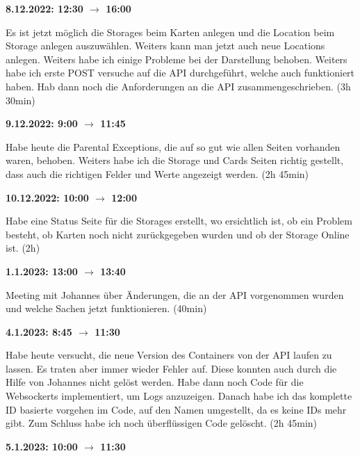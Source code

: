 \vspace{0.5cm}

\textbf{8.12.2022: 12:30 $\rightarrow$ 16:00} \

Es ist jetzt möglich die Storages beim Karten anlegen und die Location beim Storage anlegen auszuwählen. Weiters kann man jetzt auch neue Locations anlegen. Weiters habe ich einige Probleme bei der Darstellung behoben. Weiters habe ich erste POST versuche auf die API durchgeführt, welche auch funktioniert haben. Hab dann noch die Anforderungen an die API zusammengeschrieben. (3h 30min)

\vspace{0.5cm}

\textbf{9.12.2022: 9:00 $\rightarrow$ 11:45} \

Habe heute die Parental Exceptions, die auf so gut wie allen Seiten vorhanden waren, behoben. Weiters habe ich die Storage und Cards Seiten richtig gestellt, dass auch die richtigen Felder und Werte angezeigt werden. (2h 45min)

\vspace{0.5cm}

\textbf{10.12.2022: 10:00 $\rightarrow$ 12:00}

Habe eine Status Seite für die Storages erstellt, wo ersichtlich ist, ob ein Problem besteht, ob Karten noch nicht zurückgegeben wurden und ob der Storage Online ist. (2h)
\vspace{0.5cm}

\textbf{1.1.2023: 13:00  $\rightarrow$ 13:40}

Meeting mit Johannes über Änderungen, die an der API vorgenommen wurden und welche Sachen jetzt funktionieren. (40min)

\vspace{0.5cm}

\textbf{4.1.2023: 8:45 $\rightarrow$ 11:30}

Habe heute versucht, die neue Version des Containers von der API laufen zu lassen. Es traten aber immer wieder Fehler auf. Diese konnten auch durch die Hilfe von Johannes nicht gelöst werden. Habe dann noch Code für die Websockerts implementiert, um Logs anzuzeigen. Danach habe ich das komplette ID basierte vorgehen im Code, auf den Namen umgestellt, da es keine IDs mehr gibt. Zum Schluss habe ich noch überflüssigen Code gelöscht. (2h 45min)

\vspace{0.5cm}

\textbf{5.1.2023: 10:00 $\rightarrow$ 11:30}

